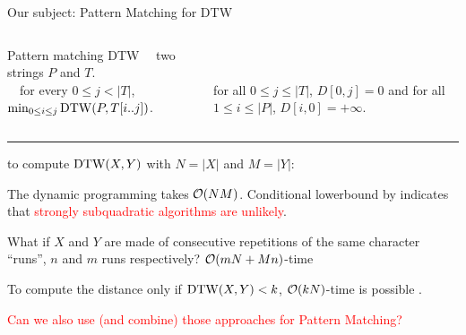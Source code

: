 \begin{frame}{Our subject: Pattern Matching for DTW}

    \begin{columns}
    \begin{mydefblock}{Pattern matching DTW}
        ~~two strings $P$ and $T$.\\ 
        ~~for every $0 \leq j < |T|$, 
        ~~~$\min_{0 \leq i \leq j} \mathrm{DTW}(P,T[i..j])$.
    \end{mydefblock}
    
    \vfill
    \\
    \smallskip
    \\
    for all $0\leq j\leq |T|$, $D[0,j]= 0$ and 
    for all $1 \leq i \leq |P|$, $D[i,0]=+\infty$.\\
    \vfill
    \end{columns}
    \pause
    
    \smallskip
    \noindent\textcolor{gray}{\rule{\textwidth}{0.1pt}}

    \smallskip
     to compute $\mathrm{DTW}(X,Y)$  with $N=|X|$ and $M=|Y|$:\pause
    
    \medskip
    The dynamic programming takes $\mathcal{O}(NM)$. \pause Conditional lowerbound by  indicates that \textcolor{red}{strongly subquadratic algorithms are unlikely}.\pause

    \medskip
    What if $X$ and $Y$ are made of consecutive repetitions of the same character ``runs'', $n$ and $m$ runs respectively? \pause
    $\mathcal{O}(mN+Mn)$-time  \pause

    To compute the distance only if $\mathrm{DTW}(X,Y) < k$, \pause $\mathcal{O}(kN)$-time is possible . \pause

    \medskip
    \textcolor{red}{Can we also use (and combine) those approaches for Pattern Matching?}
\end{frame}


